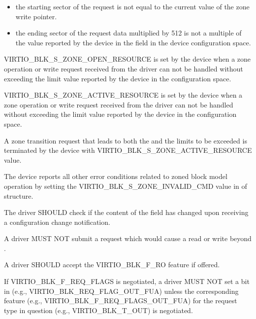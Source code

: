 \begin{itemize}
\item the starting sector of the request is not equal to the current value of
    the zone write pointer.

\item the ending sector of the request data multiplied by 512 is not a multiple
    of the value reported by the device in the field 
    in the device configuration space.
\end{itemize}

VIRTIO_BLK_S_ZONE_OPEN_RESOURCE is set by the device when a zone operation or
write request received from the driver can not be handled without exceeding the
 limit value reported by the device in the configuration
space.

VIRTIO_BLK_S_ZONE_ACTIVE_RESOURCE is set by the device when a zone operation or
write request received from the driver can not be handled without exceeding the
 limit value reported by the device in the configuration
space.

A zone transition request that leads to both the  and the
 limits to be exceeded is terminated by the device with
VIRTIO_BLK_S_ZONE_ACTIVE_RESOURCE  value.

The device reports all other error conditions related to zoned block model
operation by setting the VIRTIO_BLK_S_ZONE_INVALID_CMD value in
 of  structure.


The driver SHOULD check if the content of the  field has
changed upon receiving a configuration change notification.

A driver MUST NOT submit a request which would cause a read or write
beyond .

A driver SHOULD accept the VIRTIO_BLK_F_RO feature if offered.

If VIRTIO_BLK_F_REQ_FLAGS is negotiated, a driver MUST NOT set a bit in
 (e.g., VIRTIO_BLK_REQ_FLAG_OUT_FUA) unless the corresponding
feature (e.g., VIRTIO_BLK_F_REQ_FLAGS_OUT_FUA) for the request type in question
(e.g., VIRTIO_BLK_T_OUT) is negotiated.

